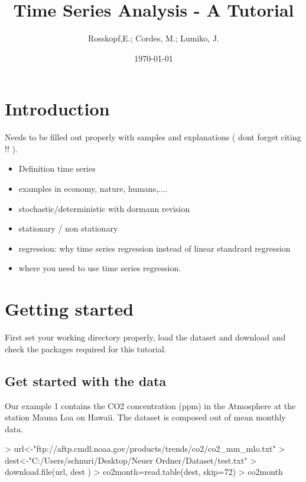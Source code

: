 \documentclass[11pt, a4paper]{article} %
\begin{document}

\title{Time Series Analysis - A Tutorial}
\author{Rosskopf,E.; Cordes, M.; Lumiko, J.}
\date{\today} %
\maketitle
{}
\tableofcontents
\section{Introduction}%
Needs to be filled out properly with samples and explanations ( dont forget citing !! ).\\
\begin{itemize}
\item Definition time series\\
\item examples in economy, nature, humans,.... \\
\item stochastic/deterministic with dormann revision\\
\item stationary / non stationary \\
\item regression: why time series regression instead of linear standrard regression\\
\item where you need to use time series regression.\\
\end{itemize}
\section{Getting started}%
First set your working directory properly, load the dataset and download and check the packages required for this tutorial. 
\subsection{Get started with the data}%
Our example 1 contains the CO2 concentration (ppm) in the Atmosphere at the station Mauna Loa on Hawaii. The dataset is composed out of mean monthly data. \\
\begin{Schunk}
\begin{Sinput}
> url<-"ftp://aftp.cmdl.noaa.gov/products/trends/co2/co2_mm_mlo.txt"
> dest<-"C:/Users/schnuri/Desktop/Neuer Ordner/Dataset/test.txt"
> download.file(url, dest ) 
> co2month=read.table(dest, skip=72)
> co2month
\end{Sinput}
\end{Schunk}
\end{document}
